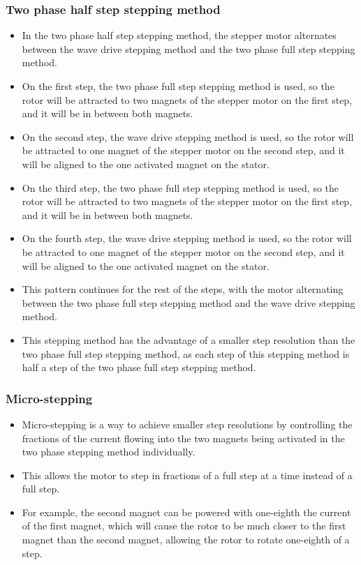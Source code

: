 \documentclass[11pt]{article}
\begin{document}
\subsubsection{Two phase half step stepping method}
\label{sec:orgb0597b0}
\begin{itemize}
\item In the two phase half step stepping method, the stepper motor alternates between the wave drive stepping method and the two phase full step stepping method.
\item On the first step, the two phase full step stepping method is used, so the rotor will be attracted to two magnets of the stepper motor on the first step, and it will be in between both magnets.
\item On the second step, the wave drive stepping method is used, so the rotor will be attracted to one magnet of the stepper motor on the second step, and it will be aligned to the one activated magnet on the stator.
\item On the third step, the two phase full step stepping method is used, so the rotor will be attracted to two magnets of the stepper motor on the first step, and it will be in between both magnets.
\item On the fourth step, the wave drive stepping method is used, so the rotor will be attracted to one magnet of the stepper motor on the second step, and it will be aligned to the one activated magnet on the stator.
\item This pattern continues for the rest of the steps, with the motor alternating between the two phase full step stepping method and the wave drive stepping method.
\item This stepping method has the advantage of a smaller step resolution than the two phase full step stepping method, as each step of this stepping method is half a step of the two phase full step stepping method.
\end{itemize}

 \newpage

\subsubsection{Micro-stepping}
\label{sec:orgdcc29da}
\begin{itemize}
\item Micro-stepping is a way to achieve smaller step resolutions by controlling the fractions of the current flowing into the two magnets being activated in the two phase stepping method individually.
\item This allows the motor to step in fractions of a full step at a time instead of a full step.
\item For example, the second magnet can be powered with one-eighth the current of the first magnet, which will cause the rotor to be much closer to the first magnet than the second magnet, allowing the rotor to rotate one-eighth of a step.
\end{itemize}
\end{document}
